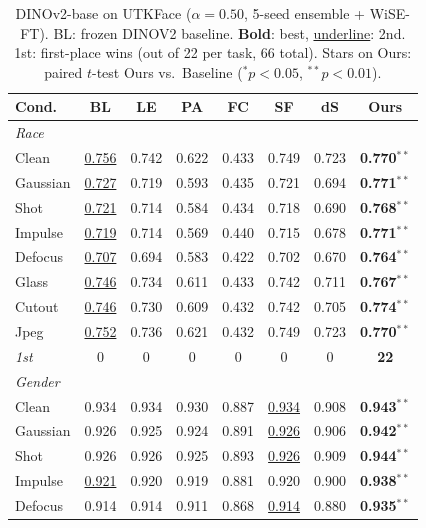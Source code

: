 \begin{table}[htbp]
\caption{DINOv2-base on UTKFace ($\alpha{=}0.50$, 5-seed ensemble + WiSE-FT). BL: frozen DINOV2 baseline. \textbf{Bold}: best, \underline{underline}: 2nd. 1st: first-place wins (out of 22 per task, 66 total). Stars on Ours: paired $t$-test Ours vs.\ Baseline ($^{*}\!p{<}0.05$, $^{**}\!p{<}0.01$).}
\label{tab:app_dinov2_utk}
\centering
\scriptsize
\setlength{\tabcolsep}{3pt}
\renewcommand{\arraystretch}{0.9}
\begin{tabular}{lccccccc}
\toprule
Cond. & BL & LE & PA & FC & SF & dS & \textbf{Ours} \\
\midrule
\multicolumn{8}{l}{\textit{Race}} \\
Clean      & \underline{0.756} & 0.742 & 0.622 & 0.433 & 0.749 & 0.723 & \textbf{0.770}$^{**}$ \\
Gaussian   & \underline{0.727} & 0.719 & 0.593 & 0.435 & 0.721 & 0.694 & \textbf{0.771}$^{**}$ \\
Shot       & \underline{0.721} & 0.714 & 0.584 & 0.434 & 0.718 & 0.690 & \textbf{0.768}$^{**}$ \\
Impulse    & \underline{0.719} & 0.714 & 0.569 & 0.440 & 0.715 & 0.678 & \textbf{0.771}$^{**}$ \\
Defocus    & \underline{0.707} & 0.694 & 0.583 & 0.422 & 0.702 & 0.670 & \textbf{0.764}$^{**}$ \\
Glass      & \underline{0.746} & 0.734 & 0.611 & 0.433 & 0.742 & 0.711 & \textbf{0.767}$^{**}$ \\
Cutout     & \underline{0.746} & 0.730 & 0.609 & 0.432 & 0.742 & 0.705 & \textbf{0.774}$^{**}$ \\
Jpeg       & \underline{0.752} & 0.736 & 0.621 & 0.432 & 0.749 & 0.723 & \textbf{0.770}$^{**}$ \\
\textit{1st} & 0 & 0 & 0 & 0 & 0 & 0 & \textbf{22} \\
\midrule
\multicolumn{8}{l}{\textit{Gender}} \\
Clean      & 0.934 & 0.934 & 0.930 & 0.887 & \underline{0.934} & 0.908 & \textbf{0.943}$^{**}$ \\
Gaussian   & 0.926 & 0.925 & 0.924 & 0.891 & \underline{0.926} & 0.906 & \textbf{0.942}$^{**}$ \\
Shot       & 0.926 & 0.926 & 0.925 & 0.893 & \underline{0.926} & 0.909 & \textbf{0.944}$^{**}$ \\
Impulse    & \underline{0.921} & 0.920 & 0.919 & 0.881 & 0.920 & 0.900 & \textbf{0.938}$^{**}$ \\
Defocus    & 0.914 & 0.914 & 0.911 & 0.868 & \underline{0.914} & 0.880 & \textbf{0.935}$^{**}$ \\

\end{tabular}
\end{table}

